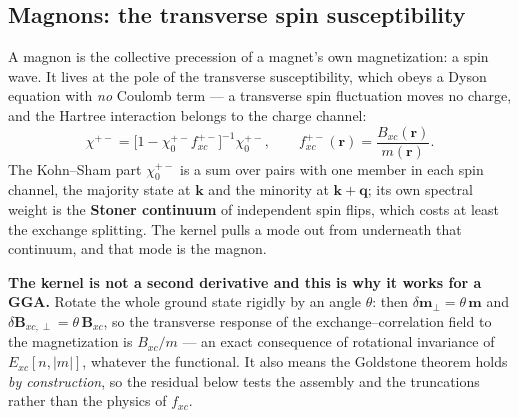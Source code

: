 \documentclass[11pt,a4paper]{article}
\begin{document}
\subsection{Magnons: the transverse spin susceptibility}

A magnon is the collective precession of a magnet's own magnetization: a spin
wave. It lives at the pole of the transverse susceptibility, which obeys a
Dyson equation with \emph{no} Coulomb term --- a transverse spin fluctuation
moves no charge, and the Hartree interaction belongs to the charge channel:
\begin{equation*}
  \chi^{+-} = \bigl[1 - \chi_0^{+-} f_{xc}^{+-}\bigr]^{-1}\chi_0^{+-},
  \qquad
  f_{xc}^{+-}(\mathbf r) = \frac{B_{xc}(\mathbf r)}{m(\mathbf r)} .
\end{equation*}
The Kohn--Sham part $\chi_0^{+-}$ is a sum over pairs with one member in each
spin channel, the majority state at $\mathbf k$ and the minority at
$\mathbf k+\mathbf q$; its own spectral weight is the \textbf{Stoner
continuum} of independent spin flips, which costs at least the exchange
splitting. The kernel pulls a mode out from underneath that continuum, and that
mode is the magnon.

\textbf{The kernel is not a second derivative and this is why it works for a
GGA.} Rotate the whole ground state rigidly by an angle $\theta$: then
$\delta\mathbf m_\perp = \theta\,\mathbf m$ and
$\delta\mathbf B_{xc,\perp} = \theta\,\mathbf B_{xc}$, so the transverse
response of the exchange--correlation field to the magnetization is
$B_{xc}/m$ --- an exact consequence of rotational invariance of
$E_{xc}[n,|m|]$, whatever the functional. It also means the Goldstone theorem
holds \emph{by construction}, so the residual below tests the assembly and the
truncations rather than the physics of $f_{xc}$.
\end{document}
